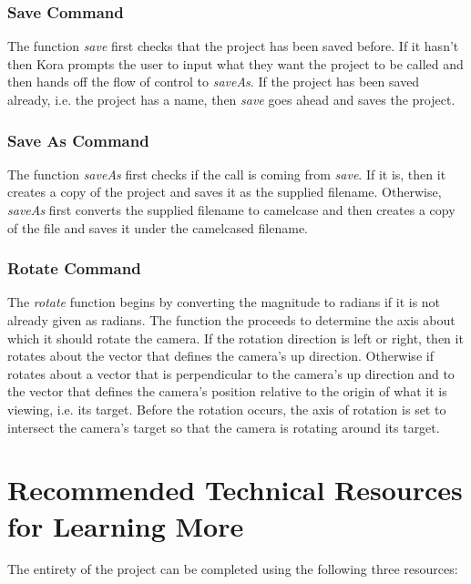 \documentclass[onecolumn, draftclsnofoot,10pt, compsoc]{IEEEtran}
\begin{document}
\subsubsection{Save Command} 
The function \textit{save} first checks that the project has been saved before. If it hasn't then Kora prompts the user to input what they want the project to be called and then hands off the flow of control to \textit{saveAs}. If the project has been saved already, i.e. the project has a name, then \textit{save} goes ahead and saves the project.

\subsubsection{Save As Command}
The function \textit{saveAs} first checks if the call is coming from \textit{save}. If it is, then it creates a copy of the project and saves it as the supplied filename. Otherwise, \textit{saveAs} first converts the supplied filename to camelcase and then creates a copy of the file and saves it under the camelcased filename.

\subsubsection{Rotate Command} 
The \textit{rotate} function begins by converting the magnitude to radians if it is not already given as radians.
The function the proceeds to determine the axis about which it should rotate the camera.
If the rotation direction is left or right, then it rotates about the vector that defines the camera's up direction.
Otherwise if rotates about a vector that is perpendicular to the camera's up direction and to the vector that defines the camera's position relative to the origin of what it is viewing, i.e. its target.
Before the rotation occurs, the axis of rotation is set to intersect the camera's target so that the camera is rotating around its target.







\section{Recommended Technical Resources for Learning More}
	The entirety of the project can be completed using the following three resources:
\end{document}

